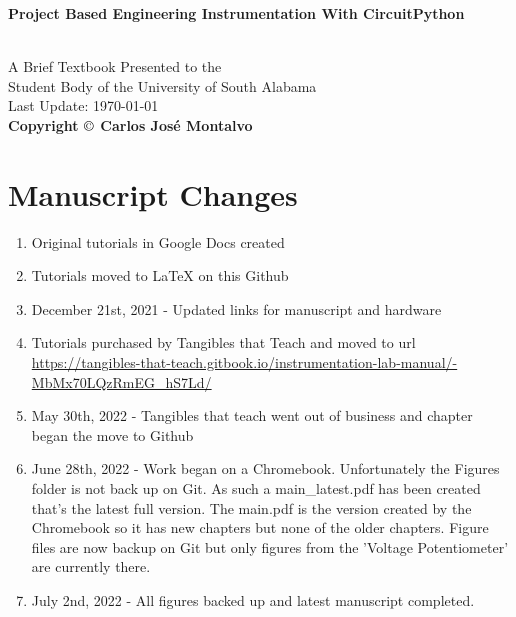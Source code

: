 \documentclass{article}
\begin{document}
\begin{center}
\begin{LARGE}{\bf Project Based Engineering Instrumentation With CircuitPython}\end{LARGE}\\
\large
\vspace{22 mm}
   A Brief Textbook Presented to the \\ 
   Student Body of the University of South Alabama \\
\vspace{22 mm}
\vspace{22 mm}
\vspace{22 mm}
       Last Update: \today\\
{\bf Copyright $\copyright$ Carlos Jos\'{e} Montalvo}
\end{center}

\linespread{1}

\newpage

\section*{Manuscript Changes}

\begin{enumerate}[itemsep=-5pt]
\item Original tutorials in Google Docs created
\item Tutorials moved to LaTeX on this Github
\item December 21st, 2021 - Updated links for manuscript and hardware
\item Tutorials purchased by Tangibles that Teach and moved to url \url{https://tangibles-that-teach.gitbook.io/instrumentation-lab-manual/-MbMx70LQzRmEG_hS7Ld/}
\item May 30th, 2022 - Tangibles that teach went out of business and
  chapter began the move to Github
\item June 28th, 2022 - Work began on a Chromebook. Unfortunately the
  Figures folder is not back up on Git. As such a main\_latest.pdf has
  been created that's the latest full version. The main.pdf is the
  version created by the Chromebook so it has new chapters but none of
  the older chapters. Figure files are now backup on Git but only
  figures from the 'Voltage Potentiometer' are currently there.
\item July 2nd, 2022 - All figures backed up and latest manuscript completed.
\end{enumerate}
\end{document}
